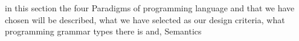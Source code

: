 in this section the four Paradigms of programming language and that we have chosen will be described, what we have selected as our design criteria, what programming grammar types there is and, Semantics